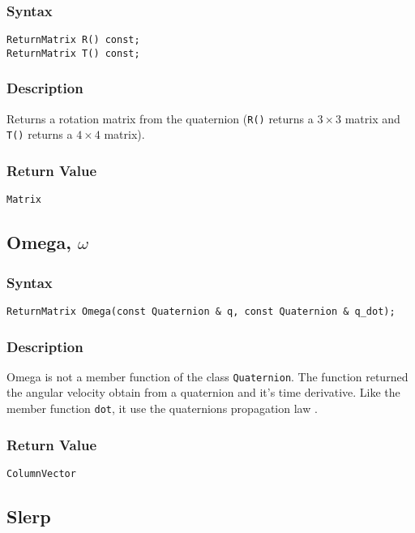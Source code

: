 \documentclass[dvips,11pt,fleqn]{report}
\begin{document}
\subsubsection*{Syntax}
\begin{verbatim}
ReturnMatrix R() const;
ReturnMatrix T() const;
\end{verbatim}
\subsubsection{Description}
Returns a rotation matrix from the quaternion (\texttt{R()} returns a
$3 \times 3$ matrix and \texttt{T()} returns a $4 \times 4$ matrix).

\subsubsection*{Return Value}

{\tt Matrix}

\newpage

\subsection*{Omega, $\omega$}

\subsubsection*{Syntax}
\begin{verbatim}
ReturnMatrix Omega(const Quaternion & q, const Quaternion & q_dot);
\end{verbatim}
\subsubsection{Description}
Omega is not a member function of the class \texttt{Quaternion}. The
function returned the angular velocity obtain from a quaternion and
it's time derivative. Like the member function \texttt{dot}, it use
the quaternions propagation law \cite{Dam98}.

\subsubsection*{Return Value}

{\tt ColumnVector}

\newpage

\subsection*{Slerp}
\end{document}
